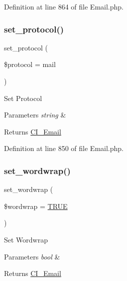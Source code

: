 Definition at line 864 of file Email.\+php.

\mbox{\label{class_c_i___email_a7be40507898a21ce9172b225e973b107}} 
\subsubsection{\texorpdfstring{set\_protocol()}{set\_protocol()}}
{\footnotesize\ttfamily set\+\_\+protocol (\begin{DoxyParamCaption}\item[{}]{\$protocol = {\ttfamily \textquotesingle{}mail\textquotesingle{}} }\end{DoxyParamCaption})}

Set Protocol


\begin{DoxyParams}{Parameters}
{\em string} & \\
\hline
\end{DoxyParams}
\begin{DoxyReturn}{Returns}
\mbox{\hyperlink{class_c_i___email}{C\+I\+\_\+\+Email}} 
\end{DoxyReturn}


Definition at line 850 of file Email.\+php.

\mbox{\label{class_c_i___email_a6abb8d5f17213eba1e243ca633da8084}} 
\subsubsection{\texorpdfstring{set\_wordwrap()}{set\_wordwrap()}}
{\footnotesize\ttfamily set\+\_\+wordwrap (\begin{DoxyParamCaption}\item[{}]{\$wordwrap = {\ttfamily \mbox{\hyperlink{constants_8php_ae04a3efe6aa42044f803ee90c2277846}{T\+R\+UE}}} }\end{DoxyParamCaption})}

Set Wordwrap


\begin{DoxyParams}{Parameters}
{\em bool} & \\
\hline
\end{DoxyParams}
\begin{DoxyReturn}{Returns}
\mbox{\hyperlink{class_c_i___email}{C\+I\+\_\+\+Email}} 
\end{DoxyReturn}


